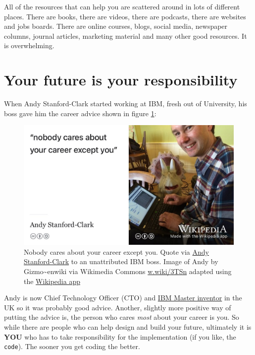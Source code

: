\documentclass[
]{book}
\begin{document}
All of the resources that can help you are scattered around in lots of different places. There are books, there are videos, there are podcasts, there are websites and jobs boards. There are online courses, blogs, social media, newspaper columns, journal articles, marketing material and many other good resources. It is overwhelming.

\hypertarget{responsibility}{%
\section{Your future is your responsibility}\label{responsibility}}

When Andy Stanford-Clark started working at IBM, fresh out of University, his boss gave him the career advice shown in figure \ref{fig:andysc-fig}:

\begin{figure}

{\centering \includegraphics[width=0.99\linewidth]{images/nobody-cares-about-your-career-except-you} 

}

\caption{Nobody cares about your career except you. Quote via \href{https://en.wikipedia.org/wiki/Andy_Stanford-Clark}{Andy Stanford-Clark} \citep{andystanfordclark} to an unattributed IBM boss. Image of Andy by Gizmo\textasciitilde enwiki via Wikimedia Commons \href{https://w.wiki/3TSn}{w.wiki/3TSn} adapted using the \href{https://apps.apple.com/us/app/wikipedia/id324715238}{Wikipedia app}}\label{fig:andysc-fig}
\end{figure}



Andy is now Chief Technology Officer (CTO) and \href{https://en.wikipedia.org/wiki/IBM_Master_Inventor}{IBM Master inventor} in the UK so it was probably good advice. Another, slightly more positive way of putting the advice is, the person who cares \emph{most} about your career is you. So while there are people who can help design and build your future, ultimately it is \textbf{YOU} who has to take responsibility for the implementation (if you like, the \texttt{code}). The sooner you get coding the better.
\end{document}
